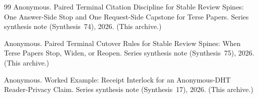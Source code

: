 \documentclass[11pt]{article}
\begin{document}
\begin{thebibliography}{99}
Anonymous.
\newblock Paired Terminal Citation Discipline for Stable Review Spines: One Answer-Side Stop and One Request-Side Capstone for Terse Papers.
\newblock Series synthesis note (Synthesis~74), 2026. (This archive.)

Anonymous.
\newblock Paired Terminal Cutover Rules for Stable Review Spines: When Terse Papers Stop, Widen, or Reopen.
\newblock Series synthesis note (Synthesis~75), 2026. (This archive.)

Anonymous.
\newblock Worked Example: Receipt Interlock for an Anonymous-DHT Reader-Privacy Claim.
\newblock Series synthesis note (Synthesis~17), 2026. (This archive.)

\end{thebibliography}
\end{document}
